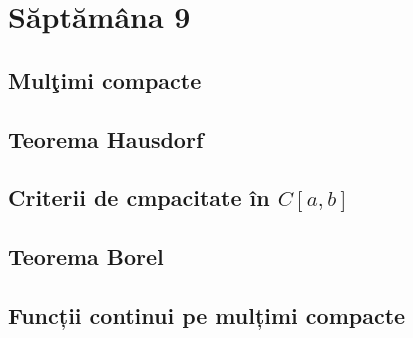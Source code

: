 \documentclass[a4paper,12pt]{article}
\theoremstyle{change}
\begin{document}
\section{Săptămâna 9}


\subsection{Mulţimi compacte}

\subsection{Teorema Hausdorf}


\subsection{Criterii de cmpacitate în $C[a,b]$}

\subsection{Teorema Borel}

\subsection{Funcții continui pe mulțimi compacte}
\end{document}
